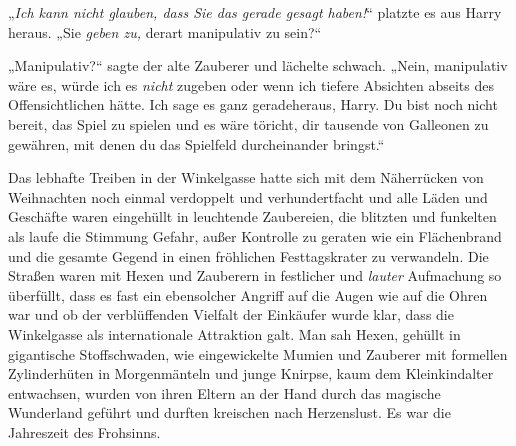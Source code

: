 „\emph{Ich kann nicht glauben, dass Sie das gerade gesagt haben!}“ platzte es aus Harry heraus. „Sie \emph{geben zu,} derart manipulativ zu sein?“

„Manipulativ?“ sagte der alte Zauberer und lächelte schwach. „Nein, manipulativ wäre es, würde ich es \emph{nicht} zugeben oder wenn ich tiefere Absichten abseits des Offensichtlichen hätte. Ich sage es ganz geradeheraus, Harry. Du bist noch nicht bereit, das Spiel zu spielen und es wäre töricht, dir tausende von Galleonen zu gewähren, mit denen du das Spielfeld durcheinander bringst.“

\later

Das lebhafte Treiben in der Winkelgasse hatte sich mit dem Näherrücken von Weihnachten noch einmal verdoppelt und verhundertfacht und alle Läden und Geschäfte waren eingehüllt in leuchtende Zaubereien, die blitzten und funkelten als laufe die Stimmung Gefahr, außer Kontrolle zu geraten wie ein Flächenbrand und die gesamte Gegend in einen fröhlichen Festtagskrater zu verwandeln. Die Straßen waren mit Hexen und Zauberern in festlicher und \emph{lauter} Aufmachung so überfüllt, dass es fast ein ebensolcher Angriff auf die Augen wie auf die Ohren war und ob der verblüffenden Vielfalt der Einkäufer wurde klar, dass die Winkelgasse als internationale Attraktion galt. Man sah Hexen, gehüllt in gigantische Stoffschwaden, wie eingewickelte Mumien und Zauberer mit formellen Zylinderhüten in Morgenmänteln und junge Knirpse, kaum dem Kleinkindalter entwachsen, wurden von ihren Eltern an der Hand durch das magische Wunderland geführt und durften kreischen nach Herzenslust. Es war die Jahreszeit des Frohsinns.%

